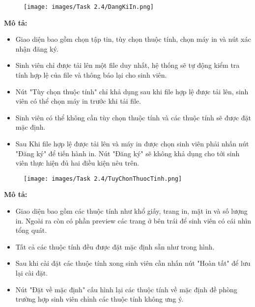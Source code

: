     \newpage
    \begin{center}
    \begin{figure}[!htp]
    \begin{center}
     \texttt{[image: images/Task 2.4/DangKiIn.png]}
    \end{center}
    \label{refhinh1}
    \end{figure}
    \end{center}
    \textbf{Mô tả:}
    \begin{itemize}
        \item Giao diện bao gồm chọn tập tin, tùy chọn thuộc tính, chọn máy in và nút xác nhận đăng ký.
        \item Sinh viên chỉ được tải lên một file duy nhất, hệ thống sẽ tự động kiểm tra tính hợp lệ của file và thông báo lại cho sinh viên.
        \item Nút "Tùy chọn thuộc tính" chỉ khả dụng sau khi file hợp lệ được tải lên, sinh viên có thể chọn máy in trước khi tải file.
        \item Sinh viên có thể không cần tùy chọn thuộc tính và các thuộc tính sẽ được đặt mặc định.
        \item Sau Khi file hợp lệ được tải lên và máy in được chọn sinh viên phải nhấn nút "Đăng ký" để tiến hành in. Nút "Đăng ký" sẽ không khả dụng cho tới sinh viên thực hiện đủ hai điều kiện nêu trên.
    \end{itemize}
    \newpage
    \begin{center}
    \begin{figure}[!htp]
    \begin{center}
     \texttt{[image: images/Task 2.4/TuyChonThuocTinh.png]}
    \end{center}
    \label{refhinh1}
    \end{figure}
    \end{center}
    \textbf{Mô tả:}
    \begin{itemize}
        \item Giao diện bao gồm các thuộc tính như khổ giấy, trang in, mặt in và số lượng in. Ngoài ra còn có phần preview các trang ở bên trái để sinh viên có cái nhìn tổng quát.
        \item Tất cả các thuộc tính đều được đặt mặc định sẵn như trong hình.
        \item Sau khi cài đặt các thuộc tính xong sinh viên cần nhấn nút "Hoàn tất" để lưu lại cài đặt.
        \item Nút "Đặt về mặc định" cấu hình lại các thuộc tính về mặc định đề phòng trường hợp sinh viên chỉnh các thuộc tính không ưng ý. 
    \end{itemize}
    
